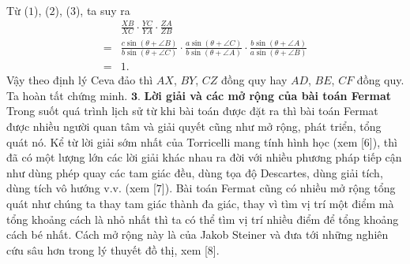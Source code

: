\begin{multicols}{2}
\begin{align*}
		\end{align*}
		Từ ($1$), ($2$), ($3$), ta suy ra
		\begin{align*}
			&\frac{XB}{XC}\cdot\frac{YC}{YA}\cdot\frac{ZA}{ZB}\\
			=&\frac{c\sin(\!\theta\!+\!\angle B)}{b\sin(\!\theta\!+\!\angle C)}\!\cdot\!\frac{a\sin(\!\theta\!+\!\angle C)}{b\sin(\!\theta\!+\!\angle A)}\!\cdot\!\frac{b\sin(\!\theta\!+\!\angle A)}{a\sin(\!\theta\!+\!\angle B)}\\
			=&1.
		\end{align*}
		Vậy theo định lý Ceva đảo thì $AX$, $BY$, $CZ$ đồng quy hay $AD$, $BE$, $CF$ đồng quy. Ta hoàn tất chứng minh.
	\vskip 0.1cm
	$\pmb{3.}$ \textbf{\color{cackithi}Lời giải và các mở rộng của bài toán Fermat}
	\vskip 0.1cm
	Trong suốt quá trình lịch sử từ khi bài toán được đặt ra thì bài toán Fermat được nhiều người quan tâm và giải quyết cũng như mở rộng, phát triển, tổng quát nó. Kể từ lời giải sớm nhất của Torricelli mang tính hình học (xem [$6$]), thì đã có một lượng lớn các lời giải khác nhau ra đời với nhiều phương pháp tiếp cận như dùng phép quay các tam giác đều, dùng tọa độ Descartes, dùng giải tích, dùng tích vô hướng  v.v. (xem [$7$]).
	\vskip 0.1cm
	Bài toán Fermat cũng có nhiều mở rộng tổng quát như chúng ta thay tam giác thành đa giác, thay vì tìm vị trí một điểm mà tổng khoảng cách là nhỏ nhất thì ta có thể tìm vị trí nhiều điểm để tổng khoảng cách bé nhất. Cách mở rộng này là của Jakob Steiner và đưa tới những nghiên cứu sâu hơn trong lý thuyết đồ thị, xem [$8$]. 
	

\end{multicols}
